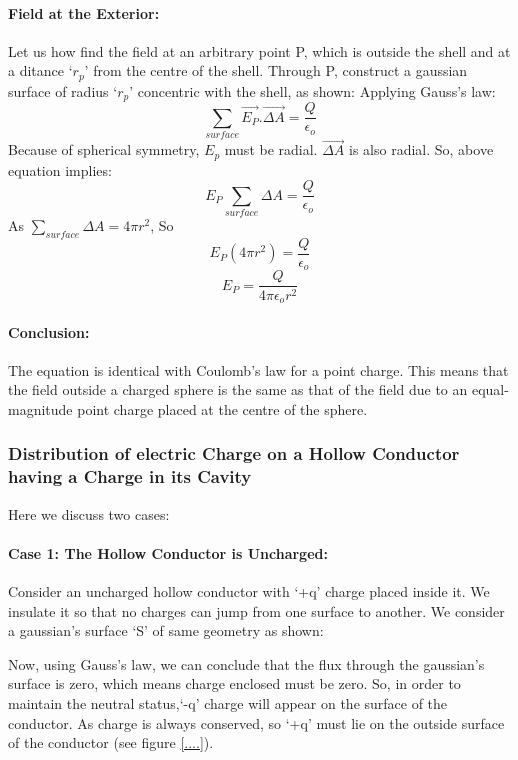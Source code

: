 \paragraph{Field at the Exterior:}
Let us how find the field at an arbitrary point P,
which is outside the shell and at a ditance `$r_{p}$' from the
centre of the shell. Through P, construct a gaussian surface of 
radius `$r_{p}$' concentric with the shell, as shown:
Applying Gauss’s law:
\begin{equation}
  \sum_{surface} \vec{E_{P}}.\vec{\Delta A}  = \frac{Q}{\epsilon_{o}} \nonumber
\end{equation}
Because of spherical symmetry, $E_{p}$ must be radial. $\vec{\Delta A}$
is also radial. So, above equation implies:
\begin{equation}
  E_{P}\sum_{surface} \Delta A = \frac{Q}{\epsilon_{o}} \nonumber
\end{equation}
As $\sum_{surface} \Delta A = 4\pi r^{2}$, So
\begin{equation}
  E_{P}(4\pi r^{2}) = \frac{Q}{\epsilon_{o}}  \nonumber
\end{equation}
\begin{equation}\label{eq:11.25}
  E_{P} = \frac{Q}{4\pi\epsilon_{o}r^{2}} 
\end{equation}
\paragraph{Conclusion:}
The equation is identical with Coulomb’s law for a point charge.
This means that the field outside a charged sphere is the same as
that of the field due to an equal-magnitude point charge
placed at the centre of the sphere.
\subsubsection{Distribution of electric Charge on a
Hollow Conductor having a Charge in its Cavity}
Here we discuss two cases:
\paragraph{Case 1: The Hollow Conductor is Uncharged:}
Consider an uncharged hollow conductor with ‘+q’ charge placed inside it.
We insulate it so that no charges can jump from one surface to another.
We consider a gaussian’s surface ‘S’ of same geometry as shown:

Now, using Gauss’s law, we can conclude that the flux through
the gaussian’s surface is zero, which means charge enclosed must be zero.
So, in order to maintain the neutral status,‘-q’ charge will
appear on the surface of the conductor. As charge is always conserved,
so ‘+q’ must lie on the outside surface of the conductor (see figure \ref{....}).

